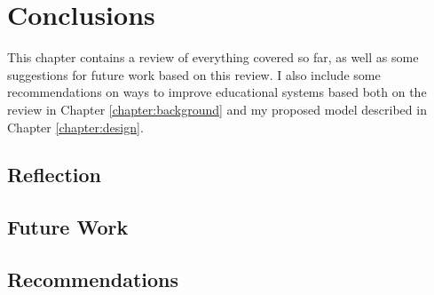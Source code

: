 \chapter{Conclusions}
\label{chapter:conclusions}
  This chapter contains a review of everything covered so far, as well as some suggestions for future work based on this review. I also include some recommendations on ways to improve educational systems based both on the review in Chapter \ref{chapter:background} and my proposed model described in Chapter \ref{chapter:design}.

  \section{Reflection}
  \section{Future Work}
  \section{Recommendations}
